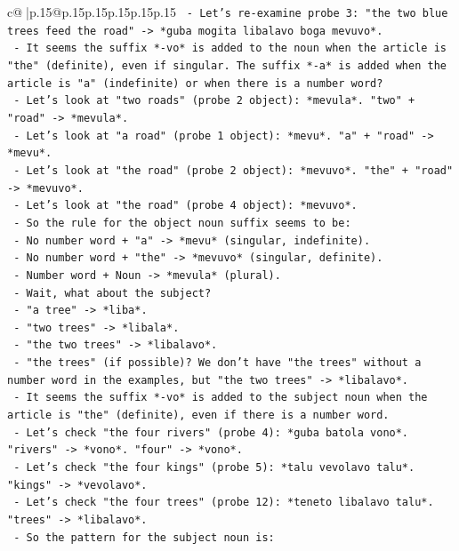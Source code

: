\documentclass{article}
\begin{document}
{\begin{supertabular}{c@{$\;$}|p{.15\linewidth}@{}p{.15\linewidth}p{.15\linewidth}p{.15\linewidth}p{.15\linewidth}p{.15\linewidth}}
{{{\texttt{  {-} Let's re{-}examine probe 3: "the two blue trees feed the road" {-}> *guba mogita libalavo boga mevuvo*.} \\
\texttt{  {-} It seems the suffix *{-}vo* is added to the noun when the article is "the" (definite), even if singular. The suffix *{-}a* is added when the article is "a" (indefinite) or when there is a number word?} \\
\texttt{  {-} Let's look at "two roads" (probe 2 object): *mevula*. "two" + "road" {-}> *mevula*.} \\
\texttt{  {-} Let's look at "a road" (probe 1 object): *mevu*. "a" + "road" {-}> *mevu*.} \\
\texttt{  {-} Let's look at "the road" (probe 2 object): *mevuvo*. "the" + "road" {-}> *mevuvo*.} \\
\texttt{  {-} Let's look at "the road" (probe 4 object): *mevuvo*.} \\
\texttt{  {-} So the rule for the object noun suffix seems to be:} \\
\texttt{    {-} No number word + "a" {-}> *mevu* (singular, indefinite).} \\
\texttt{    {-} No number word + "the" {-}> *mevuvo* (singular, definite).} \\
\texttt{    {-} Number word + Noun {-}> *mevula* (plural).} \\
\texttt{  {-} Wait, what about the subject?} \\
\texttt{    {-} "a tree" {-}> *liba*.} \\
\texttt{    {-} "two trees" {-}> *libala*.} \\
\texttt{    {-} "the two trees" {-}> *libalavo*.} \\
\texttt{    {-} "the trees" (if possible)? We don't have "the trees" without a number word in the examples, but "the two trees" {-}> *libalavo*.} \\
\texttt{    {-} It seems the suffix *{-}vo* is added to the subject noun when the article is "the" (definite), even if there is a number word.} \\
\texttt{    {-} Let's check "the four rivers" (probe 4): *guba batola vono*. "rivers" {-}> *vono*. "four" {-}> *vono*.} \\
\texttt{    {-} Let's check "the four kings" (probe 5): *talu vevolavo talu*. "kings" {-}> *vevolavo*.} \\
\texttt{    {-} Let's check "the four trees" (probe 12): *teneto libalavo talu*. "trees" {-}> *libalavo*.} \\
\texttt{    {-} So the pattern for the subject noun is:} \\
}}}
\end{supertabular}}
\end{document}
